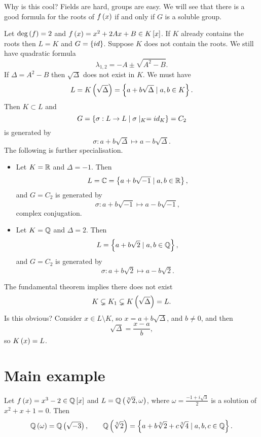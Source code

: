 Why is this cool? Fields are hard, groups are easy. We will see that there is a good formula for the roots of $ f\left( x \right) $ if and only if $ G $ is a soluble group.


\begin{example*}
Let $ \deg\left( f \right) = 2 $ and $ f\left( x \right) = x^2 + 2Ax + B \in K\left[ x \right] $. If $ K $ already contains the roots then $ L = K $ and $ G = \left\{ id \right\} $. Suppose $ K $ does not contain the roots. We still have quadratic formula
$$ \lambda_{1, 2} = -A \pm \sqrt{A^2 - B}. $$
If $ \Delta = A^2 - B $ then $ \sqrt{\Delta} $ does not exist in $ K $. We must have
$$ L = K\left( \sqrt{\Delta} \right) = \left\{ a + b\sqrt{\Delta} \mid a, b \in K \right\}. $$
Then $ K \subset L $ and
$$ G = \left\{ \sigma : L \to L \mid \sigma \mid_K = id_K \right\} = C_2 $$
is generated by
$$ \sigma : a + b\sqrt{\Delta} \mapsto a - b\sqrt{\Delta}. $$
The following is further specialisation.
\begin{itemize}
\item Let $ K = \mathbb{R} $ and $ \Delta = -1 $. Then
$$ L = \mathbb{C} = \left\{ a + b\sqrt{-1} \mid a, b \in \mathbb{R} \right\}, $$
and $ G = C_2 $ is generated by
$$ \sigma : a + b\sqrt{-1} \mapsto a - b\sqrt{-1}, $$
complex conjugation.
\item Let $ K = \mathbb{Q} $ and $ \Delta = 2 $. Then
$$ L = \left\{ a + b\sqrt{2} \mid a, b \in \mathbb{Q} \right\}, $$
and $ G = C_2 $ is generated by
$$ \sigma : a + b\sqrt{2} \mapsto a - b\sqrt{2}. $$
\end{itemize}
The fundamental theorem implies there does not exist
$$ K \subsetneq K_1 \subsetneq K\left( \sqrt{\Delta} \right) = L. $$
Is this obvious? Consider $ x \in L \setminus K $, so $ x = a + b\sqrt{\Delta} $, and $ b \ne 0 $, and then
$$ \sqrt{\Delta} = \dfrac{x - a}{b}, $$
so $ K\left( x \right) = L $.
\end{example*}

\pagebreak

\section{Main example}

Let $ f\left( x \right) = x^3 - 2 \in \mathbb{Q}\left[ x \right] $ and $ L = \mathbb{Q}\left( \sqrt[3]{2}, \omega \right) $, where $ \omega = \tfrac{-1 + i\sqrt{3}}{2} $ is a solution of $ x^2 + x + 1 = 0 $. Then
$$ \mathbb{Q}\left( \omega \right) = \mathbb{Q}\left( \sqrt{-3} \right), \qquad \mathbb{Q}\left( \sqrt[3]{2} \right) = \left\{ a + b\sqrt[3]{2} + c\sqrt[3]{4} \mid a, b, c \in \mathbb{Q} \right\}. $$

